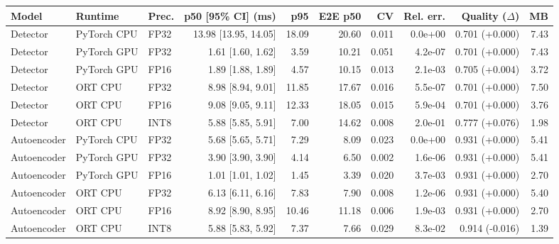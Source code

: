 \begin{tabular}{lllrrrrrrr}
\toprule
\textbf{Model} & \textbf{Runtime} & \textbf{Prec.} & \textbf{p50 [95\% CI] (ms)} & \textbf{p95} & \textbf{E2E p50} & \textbf{CV} & \textbf{Rel. err.} & \textbf{Quality ($\Delta$)} & \textbf{MB} \\
\midrule
Detector & PyTorch CPU & FP32 & 13.98 [13.95, 14.05] & 18.09 & 20.60 & 0.011 & 0.0e+00 & 0.701 (+0.000) & 7.43 \\
Detector & PyTorch GPU & FP32 & 1.61 [1.60, 1.62] & 3.59 & 10.21 & 0.051 & 4.2e-07 & 0.701 (+0.000) & 7.43 \\
Detector & PyTorch GPU & FP16 & 1.89 [1.88, 1.89] & 4.57 & 10.15 & 0.013 & 2.1e-03 & 0.705 (+0.004) & 3.72 \\
Detector & ORT CPU & FP32 & 8.98 [8.94, 9.01] & 11.85 & 17.67 & 0.016 & 5.5e-07 & 0.701 (+0.000) & 7.50 \\
Detector & ORT CPU & FP16 & 9.08 [9.05, 9.11] & 12.33 & 18.05 & 0.015 & 5.9e-04 & 0.701 (+0.000) & 3.76 \\
Detector & ORT CPU & INT8 & 5.88 [5.85, 5.91] & 7.00 & 14.62 & 0.008 & 2.0e-01 & 0.777 (+0.076) & 1.98 \\
Autoencoder & PyTorch CPU & FP32 & 5.68 [5.65, 5.71] & 7.29 & 8.09 & 0.023 & 0.0e+00 & 0.931 (+0.000) & 5.41 \\
Autoencoder & PyTorch GPU & FP32 & 3.90 [3.90, 3.90] & 4.14 & 6.50 & 0.002 & 1.6e-06 & 0.931 (+0.000) & 5.41 \\
Autoencoder & PyTorch GPU & FP16 & 1.01 [1.01, 1.02] & 1.45 & 3.39 & 0.020 & 3.7e-03 & 0.931 (+0.000) & 2.70 \\
Autoencoder & ORT CPU & FP32 & 6.13 [6.11, 6.16] & 7.83 & 7.90 & 0.008 & 1.2e-06 & 0.931 (+0.000) & 5.40 \\
Autoencoder & ORT CPU & FP16 & 8.92 [8.90, 8.95] & 10.46 & 11.18 & 0.006 & 1.9e-03 & 0.931 (+0.000) & 2.70 \\
Autoencoder & ORT CPU & INT8 & 5.88 [5.83, 5.92] & 7.37 & 7.66 & 0.029 & 8.3e-02 & 0.914 (-0.016) & 1.39 \\
\bottomrule
\end{tabular}
